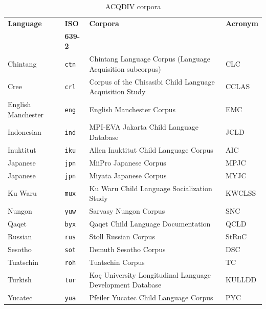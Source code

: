 \documentclass[a4paper, 11pt]{book}
\begin{document}
\begin{table}[ht!]
	\centering
	\begin{tabular}{llll}
		\toprule
			\textbf{Language} 	& \textbf{ISO} 		& \textbf{Corpora}  & \textbf{Acronym} \\
								& \textbf{639-2}	&					& \\
		\midrule
			Chintang 	& \texttt{ctn}  	 & Chintang Language Corpus (Language Acquisition subcorpus) 	& CLC \\
			Cree 		& \texttt{crl} 		 & Corpus of the Chisasibi Child Language Acquisition Study 	& CCLAS \\
			English Manchester & \texttt{eng} & English Manchester Corpus & EMC \\
			Indonesian 	& \texttt{ind}  	 & MPI-EVA Jakarta Child Language Database 						& JCLD \\
			Inuktitut 	& \texttt{iku}  	 & Allen Inuktitut Child Language Corpus 						& AIC \\
			Japanese 	& \texttt{jpn}  	 & MiiPro Japanese Corpus 										& MPJC \\
			Japanese & \texttt{jpn}  	 & Miyata Japanese Corpus 										& MYJC \\
			Ku Waru & \texttt{mux} & Ku Waru Child Language Socialization Study & KWCLSS \\
			Nungon	 	& \texttt{yuw}  	 & Sarvasy Nungon Corpus 										& SNC \\
			Qaqet & \texttt{byx} & Qaqet Child Language Documentation & QCLD \\
			Russian 	& \texttt{rus}  	 & Stoll Russian Corpus 										& StRuC \\
			Sesotho 	& \texttt{sot}  	 & Demuth Sesotho Corpus 										& DSC \\
			Tuatschin & \texttt{roh} & Tuatschin Corpus & TC \\
			Turkish 	& \texttt{tur}  	 & Koç University Longitudinal Language Development Database 	& KULLDD \\
			Yucatec 	& \texttt{yua}  	 & Pfeiler Yucatec Child Language Corpus 						& PYC \\
		\bottomrule
	\end{tabular}
	\caption{ACQDIV corpora}
	\label{tab:ACQDIV languages and corpora}
\end{table}


\end{document}
